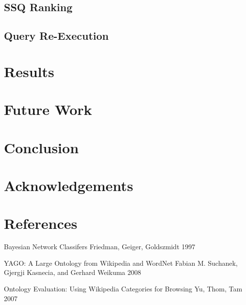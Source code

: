 \documentclass{www2010-submission}
\begin{document}
\subsection{SSQ Ranking}
\subsection{Query Re-Execution}

\section{Results}

\section{Future Work}

\section{Conclusion}

\section{Acknowledgements}

\section{References}
Bayesian Network Classifers
Friedman, Geiger, Goldszmidt 1997

YAGO: A Large Ontology from Wikipedia and WordNet
Fabian M. Suchanek, Gjergji Kasnecia, and Gerhard Weikuma 2008

Ontology Evaluation: Using Wikipedia Categories for Browsing
Yu, Thom, Tam 2007
\end{document}
